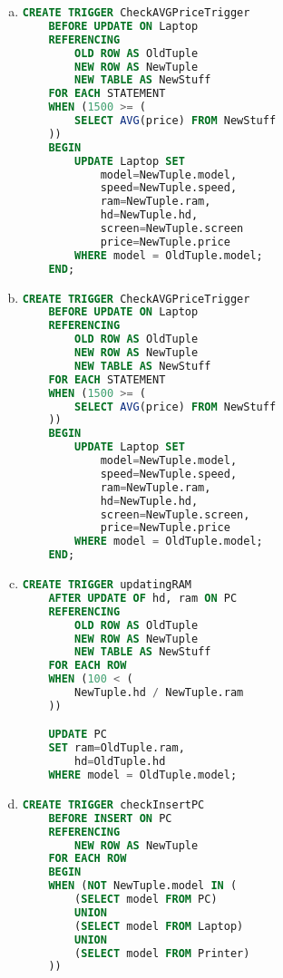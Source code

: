 \documentclass[12pt]{article}
\begin{document}
\begin{enumerate}[1.]
\begin{enumerate}[a)]
\begin{mdframed}
        \end{mdframed}

        \item

    \begin{lstlisting}[language=SQL]
    CREATE TRIGGER CheckAVGPriceTrigger
    BEFORE UPDATE ON Laptop
    REFERENCING
        OLD ROW AS OldTuple
        NEW ROW AS NewTuple
        NEW TABLE AS NewStuff
    FOR EACH STATEMENT
    WHEN (1500 >= (
        SELECT AVG(price) FROM NewStuff
    ))
    BEGIN
        UPDATE Laptop SET
            model=NewTuple.model,
            speed=NewTuple.speed,
            ram=NewTuple.ram,
            hd=NewTuple.hd,
            screen=NewTuple.screen
            price=NewTuple.price
        WHERE model = OldTuple.model;
    END;
    \end{lstlisting}

        \item

    \begin{lstlisting}[language=SQL]
    CREATE TRIGGER CheckAVGPriceTrigger
    BEFORE UPDATE ON Laptop
    REFERENCING
        OLD ROW AS OldTuple
        NEW ROW AS NewTuple
        NEW TABLE AS NewStuff
    FOR EACH STATEMENT
    WHEN (1500 >= (
        SELECT AVG(price) FROM NewStuff
    ))
    BEGIN
        UPDATE Laptop SET
            model=NewTuple.model,
            speed=NewTuple.speed,
            ram=NewTuple.ram,
            hd=NewTuple.hd,
            screen=NewTuple.screen,
            price=NewTuple.price
        WHERE model = OldTuple.model;
    END;
    \end{lstlisting}

        \item

    \begin{lstlisting}[language=SQL]
    CREATE TRIGGER updatingRAM
    AFTER UPDATE OF hd, ram ON PC
    REFERENCING
        OLD ROW AS OldTuple
        NEW ROW AS NewTuple
        NEW TABLE AS NewStuff
    FOR EACH ROW
    WHEN (100 < (
        NewTuple.hd / NewTuple.ram
    ))

    UPDATE PC
    SET ram=OldTuple.ram,
        hd=OldTuple.hd
    WHERE model = OldTuple.model;
    \end{lstlisting}

        \item


    \begin{lstlisting}[language=SQL]
    CREATE TRIGGER checkInsertPC
    BEFORE INSERT ON PC
    REFERENCING
        NEW ROW AS NewTuple
    FOR EACH ROW
    BEGIN
    WHEN (NOT NewTuple.model IN (
        (SELECT model FROM PC)
        UNION
        (SELECT model FROM Laptop)
        UNION
        (SELECT model FROM Printer)
    ))


\end{lstlisting}
\end{enumerate}
\end{enumerate}
\end{document}
